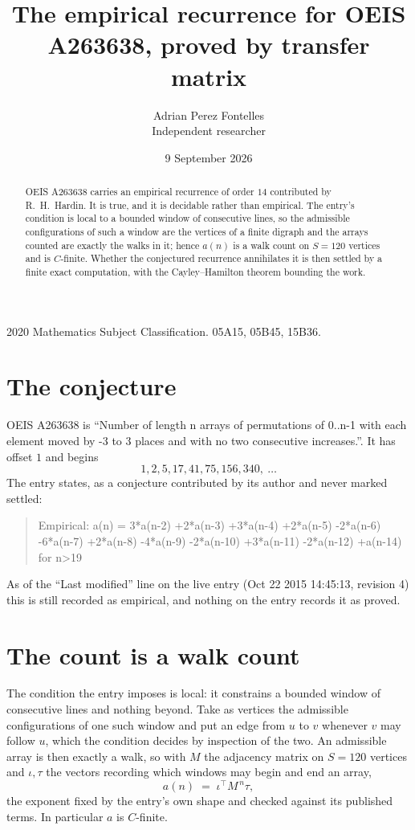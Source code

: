 \documentclass[11pt,a4paper]{article}
\title{The empirical recurrence for OEIS A263638, proved by transfer matrix}
\author{Adrian Perez Fontelles\\ \small Independent researcher}
\date{9 September 2026}
\theoremstyle{plain}
\theoremstyle{definition}
\begin{document}
\maketitle

\begin{abstract}
OEIS A263638 carries an empirical recurrence of order $14$ contributed by R.~H.~Hardin. It is
true, and it is decidable rather than empirical. The entry's condition is local to a bounded window of consecutive lines, so
the admissible configurations of such a window are the vertices of a finite digraph and the
arrays counted are exactly the walks in it; hence $a(n)$ is a walk count on $S=120$ vertices
and is $C$-finite. Whether the conjectured recurrence annihilates it is then settled by a
finite exact computation, with the Cayley--Hamilton theorem bounding the work.
\end{abstract}

\noindent\small 2020 Mathematics Subject Classification. 05A15, 05B45, 15B36.\normalsize

\section{The conjecture}

OEIS A263638 is ``Number of length n arrays of permutations of 0..n-1 with each element moved by -3 to 3 places and with no two consecutive increases.''. It has offset $1$ and begins
\[
1, 2, 5, 17, 41, 75, 156, 340,\ \dots
\]
The entry states, as a conjecture contributed by its author and never marked settled:
\begin{quote}
Empirical: a(n) = 3*a(n-2) +2*a(n-3) +3*a(n-4) +2*a(n-5) -2*a(n-6) -6*a(n-7) +2*a(n-8) -4*a(n-9) -2*a(n-10) +3*a(n-11) -2*a(n-12) +a(n-14) for n>19
\end{quote}
As of the ``Last modified'' line on the live entry (Oct 22 2015 14:45:13, revision 4) this is still
recorded as empirical, and nothing on the entry records it as proved.

\section{The count is a walk count}

The condition the entry imposes is local: it constrains a bounded window of consecutive lines and nothing beyond. Take as
vertices the admissible configurations of one such window and put an edge from $u$ to $v$
whenever $v$ may follow $u$, which the condition decides by inspection of the two. An
admissible array is then exactly a walk, so with $M$ the adjacency matrix on $S=120$ vertices
and $\iota,\tau$ the vectors recording which windows may begin and end an array,
\[
a(n)\;=\;\iota^{\!\top}M^{\,n}\tau ,
\]
the exponent fixed by the entry's own shape and checked against its published terms. In
particular $a$ is $C$-finite.
\end{document}
